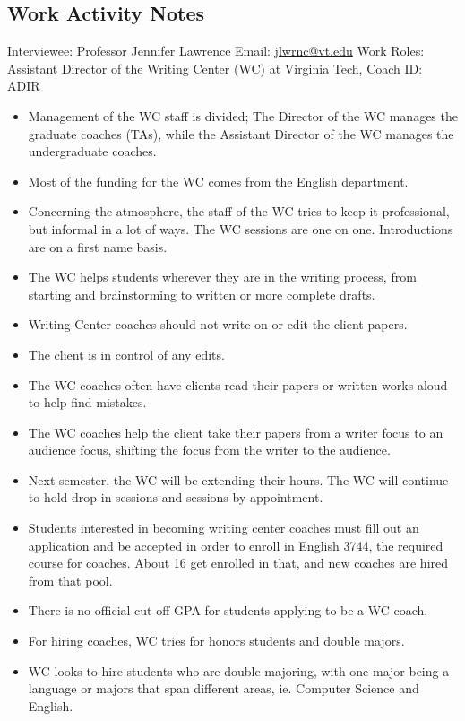 \documentclass[12pt]{article} %
\begin{document}
  \subsection*{Work Activity Notes}

  Interviewee: Professor Jennifer Lawrence 
  Email: \href{mailto:jlwrnc@vt.edu}{jlwrnc@vt.edu}
  Work Roles: Assistant Director of the Writing Center (WC) at Virginia Tech, Coach
  ID: ADIR

  \begin{itemize} \itemsep1pt \parskip0pt 
    \item Management of the WC staff is divided; The Director of the WC manages the graduate coaches (TAs), while the Assistant Director of the WC manages the undergraduate coaches.
    \item Most of the funding for the WC comes from the English department.
    \item Concerning the atmosphere, the staff of the WC tries to keep it professional, but informal in a lot of ways.  The WC sessions are one on one.  Introductions are on a first name basis. 
    \item The WC helps students wherever they are in the writing process, from starting and brainstorming to written or more complete drafts.
    \item Writing Center coaches should not write on or edit the client papers.
    \item The client is in control of any edits.
    \item The WC coaches often have clients read their papers or written works aloud to help find mistakes.
    \item The WC coaches help the client take their papers from a writer focus to an audience focus, shifting the focus from the writer to the audience.
    \item Next semester, the WC will be extending their hours.  The WC will continue to hold drop-in sessions and sessions by appointment.
    \item Students interested in becoming writing center coaches must fill out an application and be accepted in order to enroll in English 3744, the required course for coaches.  About 16 get enrolled in that, and new coaches are hired from that pool.
    \item There is no official cut-off GPA for students applying to be a WC coach.
    \item For hiring coaches, WC tries for honors students and double majors.
    \item WC looks to hire students who are double majoring, with one major being a language or majors that span different areas, ie. Computer Science and English. 

\end{itemize}
\end{document}
